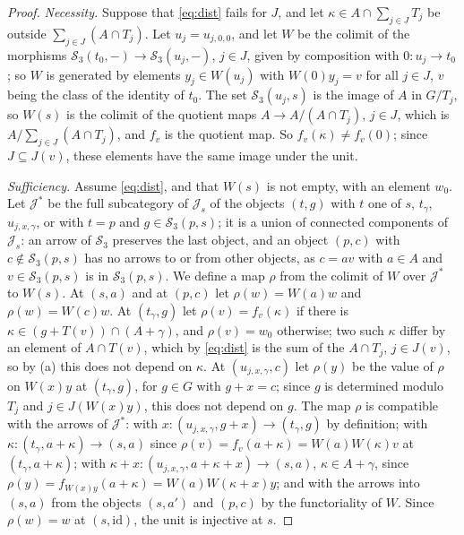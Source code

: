 \documentclass[11pt]{amsart}
\theoremstyle{definition}
\newcommand{\cS}{\mathcal S}
\newcommand{\cJ}{\mathcal J}
\newcommand{\id}{\mathrm{id}}
\begin{document}
\begin{proof}
\emph{Necessity.} Suppose that \eqref{eq:dist} fails for $J$, and let
$\kappa\in A\cap\sum_{j\in J}T_j$ be outside $\sum_{j\in J}(A\cap
T_j)$. Let $u_j=u_{j,0,0}$, and let $W$ be the colimit of the
morphisms $\cS_3(t_0,-)\to\cS_3(u_j,-)$, $j\in J$, given by
composition with $0\colon u_j\to t_0$; so $W$ is generated by elements
$y_j\in W(u_j)$ with $W(0)y_j=v$ for all $j\in J$, $v$ being the class
of the identity of $t_0$. The set $\cS_3(u_j,s)$ is the image of $A$ in
$G/T_j$, so $W(s)$ is the colimit of the quotient maps $A\to A/(A\cap
T_j)$, $j\in J$, which is $A/\sum_{j\in J}(A\cap T_j)$, and $f_v$ is
the quotient map. So $f_v(\kappa)\ne f_v(0)$; since $J\subseteq J(v)$,
these elements have the same image under the unit.

\emph{Sufficiency.} Assume \eqref{eq:dist}, and that $W(s)$ is not
empty, with an element $w_0$. Let $\cJ^*$ be the full subcategory of
$\cJ_s$ of the objects $(t,g)$ with $t$ one of $s$, $t_\gamma$,
$u_{j,x,\gamma}$, or with $t=p$ and $g\in\cS_3(p,s)$; it is a union of
connected components of $\cJ_s$: an arrow of $\cS_3$ preserves the
last object, and an object $(p,c)$ with $c\notin\cS_3(p,s)$ has no
arrows to or from other objects, as $c=av$ with $a\in A$ and $v\in
\cS_3(p,s)$ is in $\cS_3(p,s)$. We
define a map $\rho$ from the colimit of $W$ over $\cJ^*$ to $W(s)$.
At $(s,a)$ and at $(p,c)$ let $\rho(w)=W(a)w$ and $\rho(w)=W(c)w$. At
$(t_\gamma,g)$ let $\rho(v)=f_v(\kappa)$ if there is $\kappa\in
(g+T(v))\cap(A+\gamma)$, and $\rho(v)=w_0$ otherwise; two such
$\kappa$ differ by an element of $A\cap T(v)$, which by
\eqref{eq:dist} is the sum of the $A\cap T_j$, $j\in J(v)$, so by (a)
this does not depend on $\kappa$. At $(u_{j,x,\gamma},c)$ let $\rho(y)$
be the value of $\rho$ on $W(x)y$ at $(t_\gamma,g)$, for $g\in G$ with
$g+x=c$; since $g$ is determined modulo $T_j$ and $j\in J(W(x)y)$,
this does not depend on $g$. The map $\rho$ is compatible with the
arrows of $\cJ^*$: with $x\colon(u_{j,x,\gamma},g+x)\to(t_\gamma,g)$ by
definition; with $\kappa\colon(t_\gamma,a+\kappa)\to(s,a)$ since
$\rho(v)=f_v(a+\kappa)=W(a)W(\kappa)v$ at $(t_\gamma,a+\kappa)$; with
$\kappa+x\colon(u_{j,x,\gamma},a+\kappa+x)\to(s,a)$, $\kappa\in
A+\gamma$, since $\rho(y)=f_{W(x)y}(a+\kappa)=W(a)W(\kappa+x)y$; and
with the arrows into $(s,a)$ from the objects $(s,a')$ and $(p,c)$ by
the functoriality of $W$. Since $\rho(w)=w$ at $(s,\id)$, the unit is
injective at $s$.
\end{proof}
\end{document}

